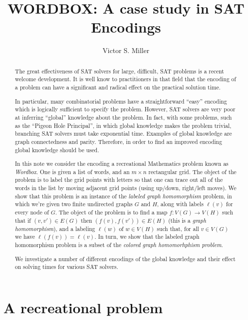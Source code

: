 \documentclass{article}
\title{WORDBOX: A case study in SAT Encodings}
\author{Victor S. Miller}
\affil{SRI, Computer Science Laboratory, Menlo Park, CA 94025
\footnote{Much of the this work performed at the IDA Center for Communications Research, Princeton, NJ 08540
USA}}
\begin{document}
\maketitle
\begin{abstract}
  The great effectiveness of SAT solvers for large, difficult, SAT
  problems is a recent welcome development.  It is well know to
  practitioners in that field that the encoding of a problem can have
  a significant and radical effect on the practical solution time.

  In particular, many combinatorial problems have a straightforward
  ``easy'' encoding which is logically sufficient to specify the
  problem.  However, SAT solvers are very poor at inferring ``global''
  knowledge about the problem.  In fact, with some problems, such as
  the ``Pigeon Hole Principal'', in which global knowledge makes the
  problem trivial, branching SAT solvers must take exponential time.
  Examples of global knowledge are graph connectedness and
  parity. Therefore, in order to find an improved encoding global
  knowledge should be used.

  In this note we consider the encoding a recreational Mathematics
  problem known as \emph{Wordbox}.  One is given a list of words, and
  an $m \times n$ rectangular grid.  The object of the problem is to
  label the grid points with letters so that one can trace out all of
  the words in the list by moving adjacent grid points (using up/down,
  right/left moves).  We show that this problem is an instance of the
  \emph{labeled graph homomorphism} problem, in which we're given two
  finite undirected graphs $G$ and $H$, along with labels $\ell(v)$ for
  every node of $G$.  The object of the problem is to find a map
  $f: V(G) \rightarrow V(H)$ such that if $(v,v') \in E(G)$ then
  $(f(v), f(v')) \in E(H)$ (this is a \emph{graph homomorphism}), and
  a labeling $\ell(w)$ of $w \in V(H)$ such that, for all $v \in V(G)$
  we have $\ell(f(v)) = \ell(v)$.  In turn, we show that the labeled
  graph homomorphism problem is a subset of the \emph{colored graph
    homomorhphism problem}.

  We investigate a number of different encodings of the global
  knowledge and their effect on solving times for various SAT solvers.
\end{abstract}

\section{A recreational problem}
\label{sec:recreational}
\end{document}
